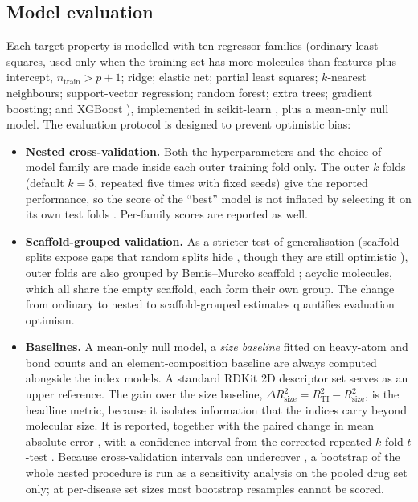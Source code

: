 \documentclass[preprint,12pt]{elsarticle}
\begin{document}
\subsection{Model evaluation}
Each target property is modelled with ten regressor families (ordinary least squares, used only when the training set has more molecules than features plus intercept, $n_{\text{train}}>p+1$; ridge; elastic net; partial least squares; $k$-nearest neighbours; support-vector regression; random forest; extra trees; gradient boosting; and XGBoost \cite{chen2016xgboost}), implemented in scikit-learn \cite{pedregosa2011}, plus a mean-only null model. The evaluation protocol is designed to prevent optimistic bias:
\begin{itemize}
  \item \textbf{Nested cross-validation.} Both the hyperparameters and the choice of model family are made inside each outer training fold only. The outer $k$ folds (default $k=5$, repeated five times with fixed seeds) give the reported performance, so the score of the ``best'' model is not inflated by selecting it on its own test folds \cite{varma2006,cawley2010,krstajic2014cross}. Per-family scores are reported as well.
  \item \textbf{Scaffold-grouped validation.} As a stricter test of generalisation (scaffold splits expose gaps that random splits hide \cite{alshehade2026benchmarking}, though they are still optimistic \cite{guo2024scaffold}), outer folds are also grouped by Bemis--Murcko scaffold \cite{bemis1996}; acyclic molecules, which all share the empty scaffold, each form their own group. The change from ordinary to nested to scaffold-grouped estimates quantifies evaluation optimism.
  \item \textbf{Baselines.} A mean-only null model, a \emph{size baseline} fitted on heavy-atom and bond counts and an element-composition baseline are always computed alongside the index models. A standard RDKit 2D descriptor set serves as an upper reference. The gain over the size baseline, $\Delta R^2_{\text{size}}=R^2_{\text{TI}}-R^2_{\text{size}}$, is the headline metric, because it isolates information that the indices carry beyond molecular size. It is reported, together with the paired change in mean absolute error \cite{alexander2015beware}, with a confidence interval from the corrected repeated $k$-fold $t$-test \cite{nadeau2003,bouckaert2004}. Because cross-validation intervals can undercover \cite{bates2023cv}, a bootstrap of the whole nested procedure is run as a sensitivity analysis on the pooled drug set only; at per-disease set sizes most bootstrap resamples cannot be scored.

\end{itemize}
\end{document}
